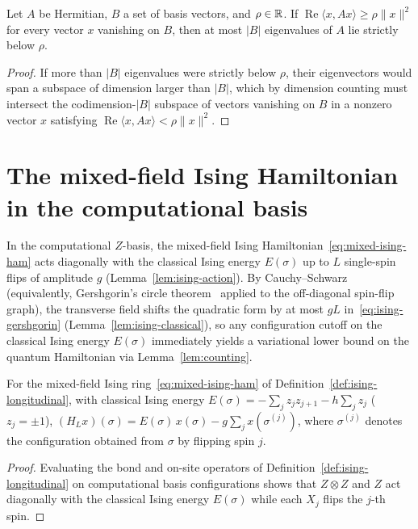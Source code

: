 \begin{lemma}
  \label{lem:counting}
  \leanok
  Let \(A\) be Hermitian, \(B\) a set of basis vectors, and \(\rho \in \mathbb{R}\). If
  \(\operatorname{Re}\langle x, Ax \rangle \ge \rho \|x\|^2\) for every vector \(x\) vanishing on
  \(B\), then at most \(|B|\) eigenvalues of \(A\) lie strictly below \(\rho\).
\end{lemma}
\begin{proof}
  \leanok
  If more than \(|B|\) eigenvalues were strictly below \(\rho\), their eigenvectors would span a
  subspace of dimension larger than \(|B|\), which by dimension counting must intersect the
  codimension-\(|B|\) subspace of vectors vanishing on \(B\) in a nonzero vector \(x\) satisfying
  \(\operatorname{Re}\langle x, Ax \rangle < \rho \|x\|^2\).
\end{proof}

\section{The mixed-field Ising Hamiltonian in the computational basis}

In the computational \(Z\)-basis, the mixed-field Ising Hamiltonian~\eqref{eq:mixed-ising-ham} acts
diagonally with the classical Ising energy \(E(\sigma)\) up to \(L\) single-spin flips of amplitude
\(g\) (Lemma~\ref{lem:ising-action}). By Cauchy--Schwarz (equivalently, Gershgorin's circle
theorem~\cite{Gershgorin1931Uber} applied to the off-diagonal spin-flip graph), the transverse
field shifts the quadratic form by at most \(gL\) in~\eqref{eq:ising-gershgorin}
(Lemma~\ref{lem:ising-classical}), so any configuration cutoff on the classical Ising energy
\(E(\sigma)\) immediately yields a variational lower bound on the quantum Hamiltonian via
Lemma~\ref{lem:counting}.

\begin{lemma}
  \label{lem:ising-action}
  \leanok
  For the mixed-field Ising ring~\eqref{eq:mixed-ising-ham} of
  Definition~\ref{def:ising-longitudinal}, with classical Ising energy
  \(E(\sigma) = -\sum_j z_j z_{j+1} - h \sum_j z_j\) (\(z_j = \pm 1\)),
  \((H_L x)(\sigma) = E(\sigma)\, x(\sigma) - g \sum_j x(\sigma^{(j)})\), where \(\sigma^{(j)}\)
  denotes the configuration obtained from \(\sigma\) by flipping spin \(j\).
\end{lemma}
\begin{proof}
  \leanok
  Evaluating the bond and on-site operators of Definition~\ref{def:ising-longitudinal} on
  computational basis configurations shows that \(Z \otimes Z\) and \(Z\) act diagonally with the
  classical Ising energy \(E(\sigma)\) while each \(X_j\) flips the \(j\)-th spin.
\end{proof}


